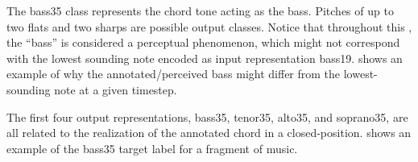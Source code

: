 
The \gls{bass35} class represents the chord tone acting as
the bass. Pitches of up to two flats and two sharps are
possible output classes. Notice that throughout this
\thesisdiss{}, the ``bass'' is considered a perceptual
phenomenon, which might not correspond with the lowest
sounding note encoded as input representation \gls{bass19}.
 shows an example of why
the annotated/perceived bass might differ from the
lowest-sounding note at a given timestep.


The first four output representations, \gls{bass35},
\gls{tenor35}, \gls{alto35}, and \gls{soprano35}, are all
related to the realization of the annotated chord in a
\gls{closed-position}.  shows
an example of the \gls{bass35} target label for a fragment
of music.



